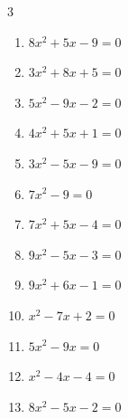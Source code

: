\begin{multicols}{3}
\begin{enumerate}
  \item $8x^{2}+5x-9=0$


  \item $3x^{2}+8x+5=0$


  \item $5x^{2}-9x-2=0$


  \item $4x^{2}+5x+1=0$


  \item $3x^{2}-5x-9=0$


  \item $7x^{2}-9=0$


  \item $7x^{2}+5x-4=0$


\columnbreak %

  \item $9x^{2}-5x-3=0$


  \item $9x^{2}+6x-1=0$


  \item $x^{2}-7x+2=0$


  \item $5x^{2}-9x=0$


  \item $x^{2}-4x-4=0$


  \item $8x^{2}-5x-2=0$


\end{enumerate}
\end{multicols}
